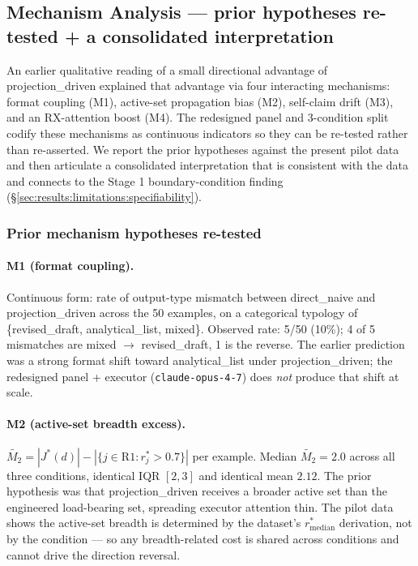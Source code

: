 \subsection{Mechanism Analysis --- prior hypotheses re-tested + a consolidated interpretation}
\label{sec:results:mechanism}

An earlier qualitative reading of a small directional advantage of projection\_driven explained that advantage via four interacting mechanisms: format coupling (M1), active-set propagation bias (M2), self-claim drift (M3), and an RX-attention boost (M4). The redesigned panel and 3-condition split codify these mechanisms as continuous indicators so they can be re-tested rather than re-asserted. We report the prior hypotheses against the present pilot data and then articulate a consolidated interpretation that is consistent with the data and connects to the Stage 1 boundary-condition finding (\S\ref{sec:results:limitations:specifiability}).

\subsubsection{Prior mechanism hypotheses re-tested}
\label{sec:results:mechanism:prior_retest}

\paragraph{M1 (format coupling).} Continuous form: rate of output-type mismatch between direct\_naive and projection\_driven across the 50 examples, on a categorical typology of \{revised\_draft, analytical\_list, mixed\}. Observed rate: 5/50 (10\%); 4 of 5 mismatches are mixed $\to$ revised\_draft, 1 is the reverse. The earlier prediction was a strong format shift toward analytical\_list under projection\_driven; the redesigned panel + executor (\texttt{claude-opus-4-7}) does \emph{not} produce that shift at scale.

\paragraph{M2 (active-set breadth excess).} $\widetilde{M_2} = |J^*(d)| - |\{j \in \text{R1} : r^*_j > 0.7\}|$ per example. Median $\widetilde{M_2} = 2.0$ across all three conditions, identical IQR $[2, 3]$ and identical mean $2.12$. The prior hypothesis was that projection\_driven receives a broader active set than the engineered load-bearing set, spreading executor attention thin. The pilot data shows the active-set breadth is determined by the dataset's $r^*_{\text{median}}$ derivation, not by the condition --- so any breadth-related cost is shared across conditions and cannot drive the direction reversal.

